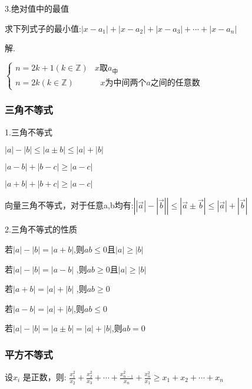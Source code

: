 \documentclass[UTF8]{ctexart}
\begin{document}
3.绝对值中的最值

求下列式子的最小值:$\left | x-a_{1} \right | +\left | x-a_{2} \right | +\left | x-a_{3} \right |+\cdots
+\left | x-a_{n} \right |$

解.

$\begin{cases}
n=2k+1 (k \in \mathbb{Z})& \text{$x$取$a_{\text{中}}$ } \\
n=2k (k \in \mathbb{Z})& \text{ $x$为中间两个$a$之间的任意数 } 
\end{cases}$

\subsubsection{三角不等式}

1.三角不等式

$\left | a \right | -\left | b \right | \le \left | a\pm b \right | \le \left | a \right |+\left |
b \right |$

$\left | a-b \right | +\left | b-c \right | \ge \left | a-c \right |$

$\left | a+b \right | +\left | b+c \right | \ge \left | a-c \right |$ 

向量三角不等式，对于任意a,b均有:$\left | \left | \overrightarrow{a} \right |-\left | \overrightarrow{b} \right |
\right |\le \left | \overrightarrow{a} \pm \overrightarrow{b} \right |\le \left |
\overrightarrow{a} \right |+ \left | \overrightarrow{b} \right |$

2.三角不等式的性质

若$\left | a \right | -\left | b \right | =\left | a+b \right |$,则$ab\le 0\text{且}\left |  a \right |\ge
\left | b \right |$

若$\left | a \right | -\left | b \right | =\left | a-b \right |$ ,则$ab\ge 0\text{且}\left | a \right |\ge
\left | b \right |$

若$\left | a+b \right | =\left | a \right | +\left | b \right |$ ,则$ab\ge 0$

若$\left | a-b \right | =\left | a \right | +\left | b \right |$,则$ab\le 0$

若$\left | a \right | -\left | b \right | =\left | a\pm b \right | =\left | a \right |+\left | b
\right |$,则$ab=0$

\subsubsection{平方不等式}

设$x_{i}$ 是正数，则:
$\frac{x_{1}^2 }{x_{2}} +\frac{x_{2}^2 }{x_{3}} +\cdots
+\frac{x_{n-1}^2}{x_{n}}+\frac{x_{n}^2}{x_{1}}\ge x_{1}+x_{2}+\cdots +x_{n}$
\end{document}
